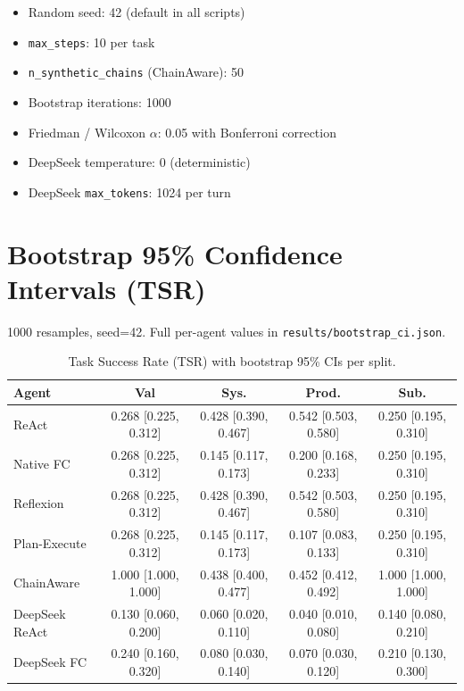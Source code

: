 \documentclass[10pt]{article}
\begin{document}
\begin{itemize}
    \item Random seed: 42 (default in all scripts)
    \item \texttt{max\_steps}: 10 per task
    \item \texttt{n\_synthetic\_chains} (ChainAware): 50
    \item Bootstrap iterations: 1000
    \item Friedman / Wilcoxon $\alpha$: 0.05 with Bonferroni correction
    \item DeepSeek temperature: 0 (deterministic)
    \item DeepSeek \texttt{max\_tokens}: 1024 per turn
\end{itemize}

\section{Bootstrap 95\% Confidence Intervals (TSR)}

1000 resamples, seed=42. Full per-agent values in \texttt{results/bootstrap\_ci.json}.

\begin{table}[h]
\centering
\small
\begin{tabular}{lcccc}
\toprule
Agent & Val & Sys. & Prod. & Sub. \\
\midrule
ReAct & 0.268 [0.225, 0.312] & 0.428 [0.390, 0.467] & 0.542 [0.503, 0.580] & 0.250 [0.195, 0.310] \\
Native FC & 0.268 [0.225, 0.312] & 0.145 [0.117, 0.173] & 0.200 [0.168, 0.233] & 0.250 [0.195, 0.310] \\
Reflexion & 0.268 [0.225, 0.312] & 0.428 [0.390, 0.467] & 0.542 [0.503, 0.580] & 0.250 [0.195, 0.310] \\
Plan-Execute & 0.268 [0.225, 0.312] & 0.145 [0.117, 0.173] & 0.107 [0.083, 0.133] & 0.250 [0.195, 0.310] \\
ChainAware & 1.000 [1.000, 1.000] & 0.438 [0.400, 0.477] & 0.452 [0.412, 0.492] & 1.000 [1.000, 1.000] \\
DeepSeek ReAct & 0.130 [0.060, 0.200] & 0.060 [0.020, 0.110] & 0.040 [0.010, 0.080] & 0.140 [0.080, 0.210] \\
DeepSeek FC & 0.240 [0.160, 0.320] & 0.080 [0.030, 0.140] & 0.070 [0.030, 0.120] & 0.210 [0.130, 0.300] \\
\bottomrule
\end{tabular}
\caption{Task Success Rate (TSR) with bootstrap 95\% CIs per split.}
\label{tab:bootstrap_ci}
\end{table}
\end{document}
